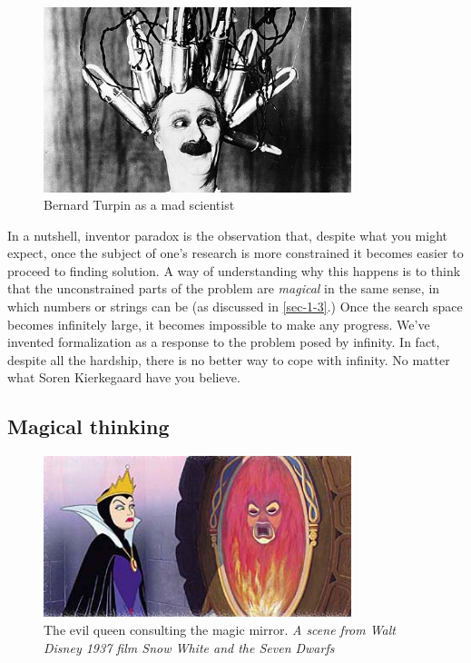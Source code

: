 \documentclass[11pt]{article}
\begin{document}
\begin{figure}[h!]
  \centering
  \includegraphics[width=0.8\textwidth]{./electorshocked-inventor.jpg}
  \caption[Inventor-chopper]{
    \ssmall Bernard Turpin as a mad scientist}
\end{figure}

In a nutshell, inventor paradox is the observation that, despite what you
might expect, once the subject of one's research is more constrained it
becomes easier to proceed to finding solution.  A way of understanding why
this happens is to think that the unconstrained parts of the problem are
\emph{magical} in the same sense, in which numbers or strings can be (as discussed
in \ref{sec-1-3}.)  Once the search space becomes infinitely large, it
becomes impossible to make any progress.  We've invented formalization as a
response to the problem posed by infinity.  In fact, despite all the
hardship, there is no better way to cope with infinity.  No matter what Soren
Kierkegaard have you believe.
\subsection{Magical thinking}
\label{sec-1-5}

\begin{figure}[h!]
  \centering
  \includegraphics[width=0.8\textwidth]{./queen.jpg}
  \caption[Mirror, mirror on the wall...]{
    \ssmall The evil queen consulting the magic mirror.
    \textit{A scene from Walt Disney 1937 film 
      Snow White and the Seven Dwarfs}}
\end{figure}
\end{document}
